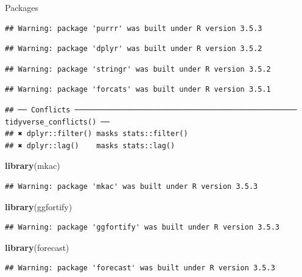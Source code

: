 \documentclass[ignorenonframetext,]{beamer}
\newenvironment{Shaded}{\begin{snugshade}}{\end{snugshade}}
\newcommand{\KeywordTok}[1]{\textcolor[rgb]{0.13,0.29,0.53}{\textbf{#1}}}
\newcommand{\NormalTok}[1]{#1}
\begin{document}
\begin{frame}[fragile]{Packages}
\begin{verbatim}
## Warning: package 'purrr' was built under R version 3.5.3
\end{verbatim}

\begin{verbatim}
## Warning: package 'dplyr' was built under R version 3.5.2
\end{verbatim}

\begin{verbatim}
## Warning: package 'stringr' was built under R version 3.5.2
\end{verbatim}

\begin{verbatim}
## Warning: package 'forcats' was built under R version 3.5.1
\end{verbatim}

\begin{verbatim}
## ── Conflicts ─────────────────────────────────────────────────── tidyverse_conflicts() ──
## ✖ dplyr::filter() masks stats::filter()
## ✖ dplyr::lag()    masks stats::lag()
\end{verbatim}

\begin{Shaded}
\begin{Highlighting}[]
\KeywordTok{library}\NormalTok{(mkac) }
\end{Highlighting}
\end{Shaded}

\begin{verbatim}
## Warning: package 'mkac' was built under R version 3.5.3
\end{verbatim}

\begin{Shaded}
\begin{Highlighting}[]
\KeywordTok{library}\NormalTok{(ggfortify)}
\end{Highlighting}
\end{Shaded}

\begin{verbatim}
## Warning: package 'ggfortify' was built under R version 3.5.3
\end{verbatim}

\begin{Shaded}
\begin{Highlighting}[]
\KeywordTok{library}\NormalTok{(forecast)}
\end{Highlighting}
\end{Shaded}

\begin{verbatim}
## Warning: package 'forecast' was built under R version 3.5.3
\end{verbatim}

\end{frame}
\end{document}
